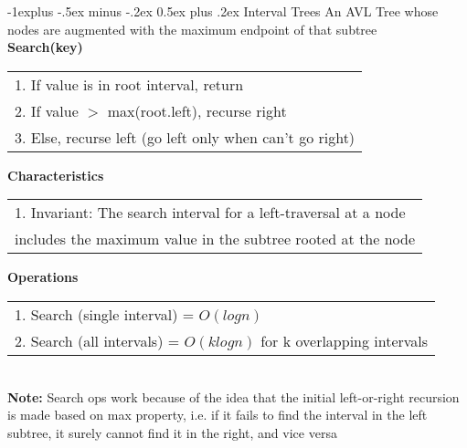\documentclass[10pt,landscape]{article}
\makeatletter
\renewcommand{\subsection}{\@startsection{subsection}{2}{0mm}%
                                {-1explus -.5ex minus -.2ex}%
                                {0.5ex plus .2ex}%
                                {\normalfont\normalsize\bfseries}}
\makeatother
\begin{document}
\begin{multicols}{3}
\subsection{Interval Trees} 
An AVL Tree whose nodes are augmented with the maximum endpoint of that subtree \\ 
\textbf{Search(key)} 
\begin{tabular}{l}
1. If value is in root interval, return \\ 
2. If value $>$ max(root.left), recurse right \\ 
3. Else, recurse left (go left only when can't go right) 
\end{tabular}
\textbf{Characteristics} \\ 
\begin{tabular}{l} 
1. Invariant: The search interval for a left-traversal at a node \\ includes the maximum value in the subtree rooted at the node \\ 
\end{tabular}
\textbf{Operations}
\begin{tabular}{l}
1. Search (single interval) = $O(logn)$ \\ 
2. Search (all intervals) = $O(klogn)$ for k overlapping intervals \\ 
\end{tabular} \\
\textbf{Note:} Search ops work because of the idea that the initial left-or-right recursion is made based on max property, i.e. if it fails to find the interval in the left subtree, it surely cannot find it in the right, and vice versa 


\end{multicols}
\end{document}

